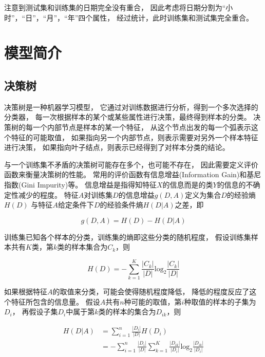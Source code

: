 \documentclass[a4paper, twocolumn]{article}
\begin{document}
注意到测试集和训练集的日期完全没有重合，
因此考虑将日期分割为“小时”，“日”，“月”，“年”四个属性，
经过统计，此时训练集和测试集完全重合。

\section{模型简介}

\subsection{决策树}

决策树是一种机器学习模型，
它通过对训练数据进行分析，得到一个多次选择的分类器，
每一次根据样本的某个或某些属性进行决策，最终得到样本的分类。
决策树的每一个内部节点是样本的某一个特征，
从这个节点出发的每一个弧表示这个特征的可能取值，
如果指向另一个内部节点，则表示需要对另外一个样本特征进行决策，
如果指向叶子结点，则表示已经得到了对样本分类的结论。

与一个训练集不矛盾的决策树可能存在多个，也可能不存在，
因此需要定义评价函数来衡量决策树的性能。
常用的评价函数有信息增益(Information Gain)和基尼指数(Gini Impurity)等。
信息增益是指得知特征$X$的信息而是的类$Y$的信息的不确定性减少的程度。
特征$A$对训练集$D$的信息增益$g(D, A)$定义为集合$D$的经验熵$H(D)$
与特征$A$给定条件下$D$的经验条件熵$H(D|A)$之差，即

\begin{equation}
    g(D, A) = H(D) - H(D|A)
\end{equation}

训练集已知各个样本的分类，训练集的熵即这些分类的随机程度，
假设训练集样本共有$K$类，第$k$类的样本集合为$C_k$，则

\begin{equation}
    H(D) = -\sum_{k=1}^K\frac{|C_k|}{|D|}\mathrm{log}_2\frac{|C_k|}{|D|}
\end{equation}

如果根据特征$A$的取值来分类，可能会使得随机程度降低，
降低的程度反应了这个特征所包含的信息量。
假设$A$共有$n$种可能的取值，第$i$种取值的样本的子集为$D_i$，
再假设子集$D_i$中属于第$k$类的样本的集合为$D_{ik}$，则

\begin{equation}
    \begin{split}
        H(D|A) &= \sum_{i=1}^n\frac{|D_i|}{|D|}H(D_i) \\
               &= -\sum_{i=1}^n\frac{|D_i|}{|D|}\sum_{k=1}^K\frac{|D_{ik}|}{|D_i|}\mathrm{log}_2\frac{|D_{ik}|}{|D_i|}
    \end{split}
\end{equation}
\end{document}
